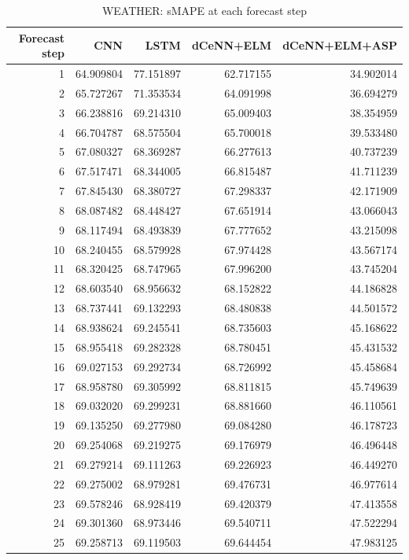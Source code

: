 \begin{table}
\caption{WEATHER: sMAPE at each forecast step}
\begin{tabular}{rrrrr}
\toprule
Forecast step & CNN & LSTM & dCeNN+ELM & dCeNN+ELM+ASP \\
\midrule
1 & 64.909804 & 77.151897 & 62.717155 & 34.902014 \\
2 & 65.727267 & 71.353534 & 64.091998 & 36.694279 \\
3 & 66.238816 & 69.214310 & 65.009403 & 38.354959 \\
4 & 66.704787 & 68.575504 & 65.700018 & 39.533480 \\
5 & 67.080327 & 68.369287 & 66.277613 & 40.737239 \\
6 & 67.517471 & 68.344005 & 66.815487 & 41.711239 \\
7 & 67.845430 & 68.380727 & 67.298337 & 42.171909 \\
8 & 68.087482 & 68.448427 & 67.651914 & 43.066043 \\
9 & 68.117494 & 68.493839 & 67.777652 & 43.215098 \\
10 & 68.240455 & 68.579928 & 67.974428 & 43.567174 \\
11 & 68.320425 & 68.747965 & 67.996200 & 43.745204 \\
12 & 68.603540 & 68.956632 & 68.152822 & 44.186828 \\
13 & 68.737441 & 69.132293 & 68.480838 & 44.501572 \\
14 & 68.938624 & 69.245541 & 68.735603 & 45.168622 \\
15 & 68.955418 & 69.282328 & 68.780451 & 45.431532 \\
16 & 69.027153 & 69.292734 & 68.726992 & 45.458684 \\
17 & 68.958780 & 69.305992 & 68.811815 & 45.749639 \\
18 & 69.032020 & 69.299231 & 68.881660 & 46.110561 \\
19 & 69.135250 & 69.277980 & 69.084280 & 46.178723 \\
20 & 69.254068 & 69.219275 & 69.176979 & 46.496448 \\
21 & 69.279214 & 69.111263 & 69.226923 & 46.449270 \\
22 & 69.275002 & 68.979281 & 69.476731 & 46.977614 \\
23 & 69.578246 & 68.928419 & 69.420379 & 47.413558 \\
24 & 69.301360 & 68.973446 & 69.540711 & 47.522294 \\
25 & 69.258713 & 69.119503 & 69.644454 & 47.983125 \\

\end{tabular}
\end{table}
